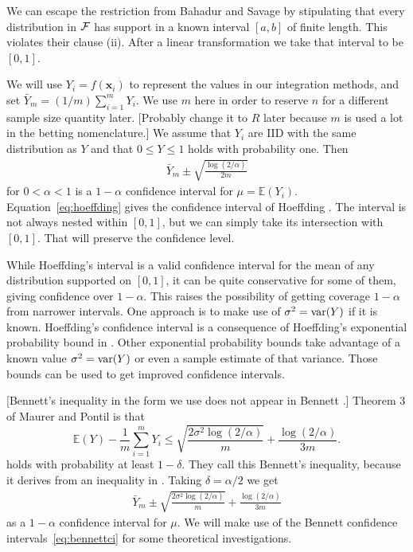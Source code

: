 \documentclass{article}
\newcommand{\art}[1]{\begingroup\color{blue}#1\endgroup}
\renewcommand{\le}{\leqslant}
\newcommand{\e}{\mathbb{E}}
\newcommand{\bsx}{\boldsymbol{x}}
\begin{document}
We can escape the restriction from Bahadur and
Savage by stipulating that every distribution in $\mathcal{F}$
has support in a known interval $[a,b]$ of finite length.
This violates their clause (ii).
After a linear transformation we take that interval
to be $[0,1]$.

We will use $Y_i = f(\bsx_i)$ to represent 
the values in our integration methods, and 
set $\bar Y_m = (1/m)\sum_{i=1}^mY_i$.  
We use $m$ here in order to reserve $n$ for a
different sample size quantity later.
\art{[Probably change it to $R$ later because $m$ is
used a lot in the betting nomenclature.]}
We assume that $Y_i$ are IID with the same
distribution as $Y$ and that
$0\le Y\le1$ holds with probability one.
Then
\begin{align}\label{eq:hoeffding}
\bar Y_m \pm \sqrt{\frac{\log(2/\alpha)}{2m}}
\end{align}
for $0<\alpha<1$ is a $1-\alpha$ confidence interval for $\mu=\e(Y_i)$.  Equation~\eqref{eq:hoeffding} gives
the confidence interval of Hoeffding \cite{hoef:1963}.  The interval is not always
nested within $[0,1]$, but we can simply take its
intersection with $[0,1]$. That will preserve the confidence level.

While Hoeffding's interval is a valid confidence interval
for the mean of any distribution supported on $[0,1]$,
it can be quite conservative for some
of them, giving confidence over $1-\alpha$. This raises
the possibility of getting coverage $1-\alpha$ from
narrower intervals.  
One approach is to make use of 
$\sigma^2=\operatorname{var}(Y)$ if it is known. 
Hoeffding's confidence interval is a consequence of
Hoeffding's exponential probability bound in \cite{hoef:1963}.
Other exponential probability bounds take advantage of
a known value $\sigma^2=\operatorname{var}(Y)$ or even a sample estimate
of that variance.  Those bounds can be used to get
improved confidence intervals.

\art{[Bennett's inequality in the form we use
does not appear in Bennett \cite{benn:1962}.]
Theorem 3 of Maurer and Pontil \cite{maurer2009empirical}
is that
$$
\e(Y) - \frac1m\sum_{i=1}^mY_i \le \sqrt{\frac{2\sigma^2\log(2/\alpha)}m}
+ \frac{\log(2/\alpha)}{3m}.
  $$
holds with probability at least $1-\delta$.
They call this Bennett's inequality, because it derives
from an inequality in \cite{benn:1962}.}
Taking $\delta =\alpha/2$ we get
\begin{align}\label{eq:bennettci}
\bar Y_m \pm \sqrt{\frac{2\sigma^2\log(2/\alpha)}m}
+ \frac{\log(2/\alpha)}{3m}
\end{align}
as a $1-\alpha$ confidence interval for $\mu$.
We will make use of the Bennett confidence
intervals~\eqref{eq:bennettci} for some
theoretical investigations. 
\end{document}
